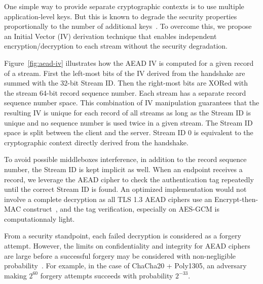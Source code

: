 One simple way to provide separate cryptographic contexts is to use multiple
application-level keys. But this is known to degrade the security properties
proportionally to the number of additional keys~\cite{chatterjee2011another}. To
overcome this, we propose an Initial Vector (IV) derivation technique that
enables independent encryption/decryption to each stream without the security
degradation.

Figure~\ref{fig:aead-iv} illustrates how the AEAD IV is computed for a given
\tcpls record of a \tcpls stream. First the left-most bits of the IV derived
from the \tls handshake are summed with the 32-bit \tcpls Stream ID. Then the
right-most bits are XORed with the stream 64-bit record sequence number. Each
\tcpls stream has a separate record sequence number space. This combination of
IV manipulation guarantees that the resulting IV is unique for each record of
all \tcpls streams as long as the Stream ID is unique and no sequence number is
used twice in a given stream. The Stream ID space is split between the client
and the server. Stream ID 0 is equivalent to the cryptographic context directly
derived from the handshake.

To avoid possible middleboxes interference, in addition to the record sequence
number, the \tcpls Stream ID is kept implicit as well. When an endpoint receives
a \tcpls record, we leverage the AEAD cipher to check the authentication tag
repeatedly until the correct \tcpls Stream ID is found. An optimized
implementation would not involve a complete decryption as all TLS 1.3 AEAD
ciphers use an Encrypt-then-MAC construct~\cite{rfc7366, rfc8446}, and the tag
verification, especially on AES-GCM is computationnaly light.

From a security standpoint, each failed decryption is considered as a forgery
attempt. However, the limits on confidentiality and integrity for AEAD ciphers
are large before a successful forgery may be considered with non-negligible
probability~\cite{luykx2015limits, aeadlimits}. For example, in the case of
ChaCha20 + Poly1305, an adversary making $2^{60}$ forgery attempts succeeds with
probability $2^{-33}$.


